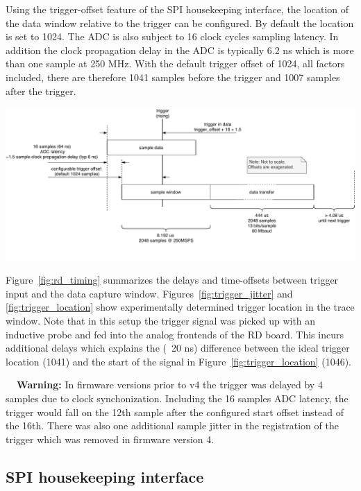 \documentclass[a4paper,indent]{paper}
\newenvironment{warn}
{\par\begin{mdframed}[linewidth=2pt,linecolor=orange,backgroundcolor=orange!10]%
    \begin{list}{}{\leftmargin=0mm}\item[\bf\danger{}~~Warning: ]}
  {\end{list}\end{mdframed}\par}
\begin{document}
Using the trigger-offset feature of the \ac{SPI} housekeeping interface, the location of the data window relative to the trigger can be configured. By default the location is set to 1024. 
The \ac{ADC} is also subject to 16 clock cycles sampling latency.
In addition the clock propagation delay in the \ac{ADC} is typically 6.2 ns which is more than one sample at 250 MHz.
With the default trigger offset of 1024, all factors included, there are therefore 1041 samples before the trigger and 1007 samples after the trigger.

\begin{center}
  \includegraphics[width=\textwidth]{img/rd_timing_v2.pdf}
  \label{fig:rd_timing}
\end{center}

Figure~\ref{fig:rd_timing} summarizes the delays and time-offsets between trigger input and the data capture window.
Figures~\ref{fig:trigger_jitter} and \ref{fig:trigger_location} show experimentally determined trigger location in the trace window. Note that in this setup the trigger signal was picked up with an inductive probe and fed into the analog frontends of the RD board. This incurs additional delays which explains the (~20 ns) difference between the ideal trigger location (1041) and the start of the signal in Figure~\ref{fig:trigger_location} (1046). 

\begin{warn}
  In firmware versions prior to v4 the trigger was delayed by 4 samples due to clock synchonization. Including the 16 samples ADC latency, the trigger would fall on the 12th sample after the configured start offset instead of the 16th. There was also one additional sample jitter in the registration of the trigger which was removed in firmware version 4. 
\end{warn}


\subsection{\acs{SPI} housekeeping interface}
\end{document}
